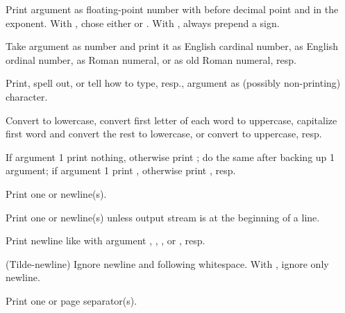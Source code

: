 \begin{LIST}{1cm}
\begin{LIST}{.5cm}
    Print argument as floating-point number with 
    before decimal point and  in the
    exponent. With , chose either  or . With , always prepend a sign.

    Take argument as number and print it as English cardinal number,
    as English ordinal number, as Roman numeral, or as old Roman
    numeral, resp.

    Print, spell out, or tell how to type, resp., argument as
    (possibly non-printing) character.

    Convert to lowercase, convert first letter of each word to
    uppercase, capitalize first word and convert
    the rest to lowercase, or convert to uppercase, resp.

    If argument  1 print nothing, otherwise print ;
    do the same after backing up 1 argument; if argument  1
    print , otherwise print , resp.

    Print one or  newline(s).

    Print one or  newline(s) unless output stream is at the
    beginning of a line.

    Print newline like  with argument
    , , , or , resp.

    (Tilde-newline) Ignore newline and following
    whitespace. With , ignore only newline.

    Print one or  page separator(s).


\end{LIST}
\end{LIST}
